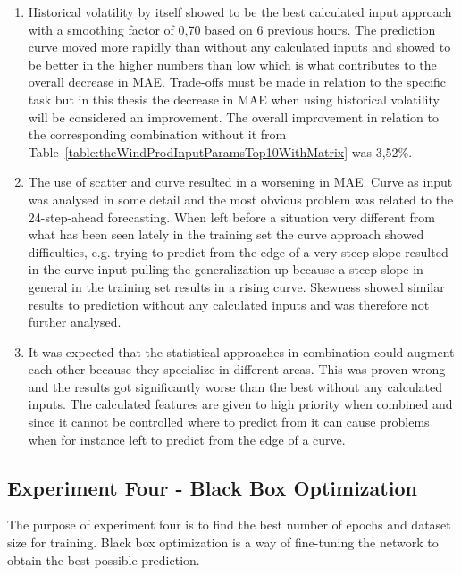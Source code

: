 \begin{enumerate}
\item Historical volatility by itself showed to be the best calculated input approach with a smoothing factor of 0,70 based on 6 previous hours. The prediction curve moved more rapidly than without any calculated inputs and showed to be better in the higher numbers than low which is what contributes to the overall decrease in MAE. Trade-offs must be made in relation to the specific task but in this thesis the decrease in MAE when using historical volatility will be considered an improvement. The overall improvement in relation to the corresponding combination without it from Table~\ref{table:theWindProdInputParamsTop10WithMatrix} was 3,52\%.
\item The use of scatter and curve resulted in a worsening in MAE. Curve as input was analysed in some detail and the most obvious problem was related to the 24-step-ahead forecasting. When left before a situation very different from what has been seen lately in the training set the curve approach showed difficulties, e.g. trying to predict from the edge of a very steep slope resulted in the curve input pulling the generalization up because a steep slope in general in the training set results in a rising curve. Skewness showed similar results to prediction without any calculated inputs and was therefore not further analysed.
\item It was expected that the statistical approaches in combination could augment each other because they specialize in different areas. This was proven wrong and the results got significantly worse than the best without any calculated inputs. The calculated features are given to high priority when combined and since it cannot be controlled where to predict from it can cause problems when for instance left to predict from the edge of a curve. 
\end{enumerate}

\newpage

\subsection{Experiment Four - Black Box Optimization}
\label{sec:experimentFourBlackBox}
The purpose of experiment four is to find the best number of epochs and dataset size for training. Black box optimization is a way of fine-tuning the network to obtain the best possible prediction.

